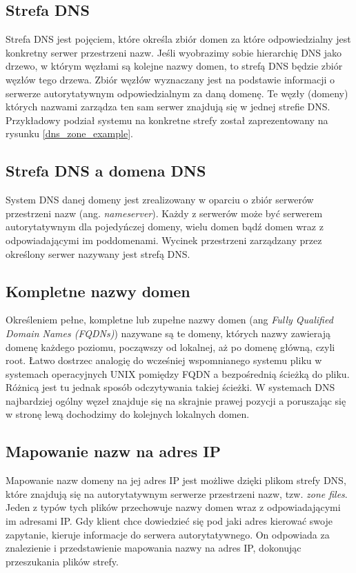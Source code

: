 \subsection{Strefa DNS}
Strefa DNS jest pojęciem, które określa zbiór domen za które odpowiedzialny jest konkretny serwer przestrzeni nazw. Jeśli wyobrazimy sobie hierarchię DNS jako drzewo, w którym węzłami są kolejne nazwy domen, to strefą DNS będzie zbiór węzłów tego drzewa. Zbiór węzłów wyznaczany jest na podstawie informacji o serwerze autorytatywnym odpowiedzialnym za daną domenę. Te węzły (domeny) których nazwami zarządza ten sam serwer znajdują się w jednej strefie DNS. Przykładowy podział systemu na konkretne strefy został zaprezentowany na rysunku \ref{dns_zone_example}.

\subsection{Strefa DNS a domena DNS}
System DNS danej domeny jest zrealizowany w oparciu o zbiór serwerów przestrzeni nazw (ang. \textit{nameserver}). Każdy z serwerów może być serwerem autorytatywnym dla pojedyńczej domeny, wielu domen bądź domen wraz z odpowiadającymi im poddomenami. Wycinek przestrzeni zarządzany przez określony serwer nazywany jest strefą DNS. 


\subsection{Kompletne nazwy domen}
Określeniem pełne, kompletne lub zupełne nazwy domen (ang \textit{Fully Qualified Domain Names (FQDNs)}) nazywane są te domeny, których nazwy zawierają domenę każdego poziomu, począwszy od lokalnej, aż po domenę główną, czyli root. Łatwo dostrzec analogię do wcześniej wspomnianego systemu pliku w systemach operacyjnych UNIX pomiędzy FQDN a bezpośrednią ścieżką do pliku. Różnicą jest tu jednak sposób odczytywania takiej ścieżki. W systemach DNS najbardziej ogólny węzeł znajduje się na skrajnie prawej pozycji a poruszając się w stronę lewą dochodzimy do kolejnych lokalnych domen. 

\subsection{Mapowanie nazw na adres IP}
Mapowanie nazw domeny na jej adres IP jest możliwe dzięki plikom strefy DNS, które znajdują się na autorytatywnym serwerze przestrzeni nazw, tzw. \textit{zone files}. Jeden z typów tych plików przechowuje nazwy domen wraz z odpowiadającymi im adresami IP. Gdy klient chce dowiedzieć się pod jaki adres kierować swoje zapytanie, kieruje informacje do serwera autorytatywnego. On odpowiada za znalezienie i przedstawienie mapowania nazwy na adres IP, dokonując przeszukania plików strefy.

